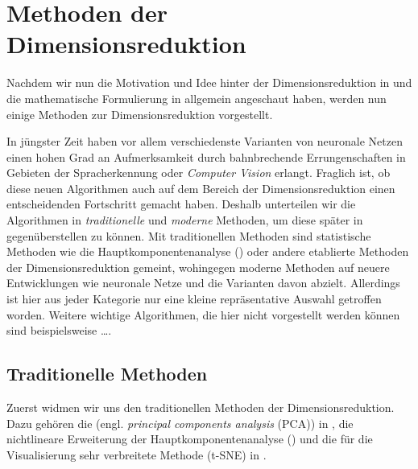 \chapter{Methoden der Dimensionsreduktion}
\label{ch:MethodenDerDimRed}

Nachdem wir nun die Motivation und Idee hinter der Dimensionsreduktion in  und die mathematische Formulierung
in  allgemein angeschaut haben,
werden nun einige Methoden zur Dimensionsreduktion vorgestellt.

In jüngster Zeit haben vor allem verschiedenste Varianten von neuronale Netzen einen hohen Grad an Aufmerksamkeit durch bahnbrechende Errungenschaften in Gebieten der Spracherkennung oder \textit{Computer Vision} erlangt. Fraglich ist, ob diese neuen Algorithmen auch auf dem Bereich der Dimensionsreduktion einen entscheidenden Fortschritt gemacht haben. Deshalb unterteilen wir die Algorithmen in \textit{traditionelle}
und \textit{moderne} Methoden, um diese später in  gegenüberstellen zu können. Mit traditionellen Methoden
sind statistische Methoden wie die Hauptkomponentenanalyse () oder andere etablierte
Methoden der Dimensionsreduktion gemeint, wohingegen moderne Methoden auf neuere Entwicklungen wie neuronale Netze und die Varianten davon abzielt. Allerdings ist hier aus jeder Kategorie nur eine kleine repräsentative Auswahl getroffen worden. Weitere wichtige Algorithmen, die hier nicht vorgestellt werden können sind beispielsweise \dots {}.

\section{Traditionelle Methoden}
\label{ch:MethodenDerDimRed:traditionell}

Zuerst widmen wir uns den traditionellen Methoden der Dimensionsreduktion.
Dazu gehören die  (engl. \textit{principal components analysis} (PCA)) in ,
die nichtlineare Erweiterung der
Hauptkomponentenanalyse ()
und die für die Visualisierung sehr verbreitete Methode  (t-SNE) in .

